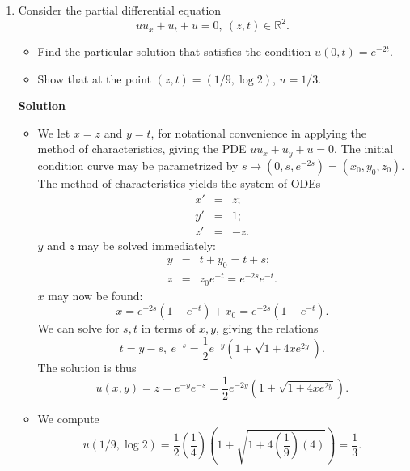 \documentclass{article}
\def\div{\mathop{\rm div}\nolimits}
\begin{document}
\begin{enumerate}
We now address the uniqueness claim.  First, \(u\) being conservative implies that \(u = \nabla f\) for some \(f\), and hence \(q = \div u = \Delta f\), i.e., \(f\) satisfies a Poisson equation.  The decay of \(u\) guarantees the solution \(f\) to be unique, and we know that \(f\) is given by convolution with the fundamental solution:
\[f(x) = (K * q)(x) = -\frac{1}{4 \pi} \int_{\mathbb{R}^3} \frac{q(y)}{|x - y|} dy.\]
It follows that \(u\) is as given.



\item Consider the partial differential equation
\[u u_x + u_t + u = 0, \ (z,t) \in \mathbb{R}^2.\]

\begin{itemize}
\item Find the particular solution that satisfies the condition \(u(0,t) = e^{-2 t}\).

\item Show that at the point \((z,t) = (1/9, \log 2)\), \(u = 1/3\).

\end{itemize}

{\bf Solution}

\begin{itemize}
\item We let \(x = z\) and \(y = t\), for notational convenience in applying the method of characteristics, giving the PDE \(u u_x + u_y + u = 0\).  The initial condition curve may be parametrized by \(s \mapsto (0, s, e^{-2 s}) = (x_0,y_0,z_0)\).  The method of characteristics yields the system of ODEs
\begin{eqnarray*}
x' & = & z; \\
y' & = & 1; \\
z' & = & -z.
\end{eqnarray*}
\(y\) and \(z\) may be solved immediately:
\begin{eqnarray*}
y & = & t + y_0 = t + s; \\
z & = & z_0 e^{-t} = e^{-2 s} e^{-t}.
\end{eqnarray*}
\(x\) may now be found:
\[x = e^{-2 s} \left( 1 - e^{-t} \right) + x_0 = e^{-2 s} \left( 1 - e^{-t} \right).\]
We can solve for \(s,t\) in terms of \(x,y\), giving the relations
\[t = y - s, \ e^{-s} = \frac{1}{2} e^{-y} \left( 1 + \sqrt{1 + 4 x e^{2 y}} \right).\]
The solution is thus
\[u(x,y) = z = e^{-y} e^{-s} = \frac{1}{2} e^{-2 y} \left( 1 + \sqrt{1 + 4 x e^{2 y}} \right).\]

\item We compute
\[u(1/9, \log 2) = \frac{1}{2} \left( \frac{1}{4} \right) \left( 1 + \sqrt{1 + 4 \left( \frac{1}{9} \right) (4)} \right) = \frac{1}{3}.\]


\end{itemize}
\end{enumerate}
\end{document}
